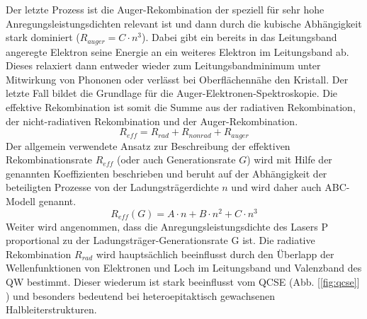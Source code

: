 Der letzte Prozess ist die Auger-Rekombination der speziell für sehr hohe Anregungsleistungsdichten relevant ist und dann durch die kubische Abhängigkeit stark dominiert ($R_{auger} = C \cdot n^3 $). Dabei gibt ein bereits in das Leitungsband angeregte Elektron seine Energie an ein weiteres Elektron im Leitungsband ab. Dieses relaxiert dann entweder wieder zum Leitungsbandminimum unter Mitwirkung von Phononen oder verlässt bei Oberflächennähe den Kristall. Der letzte Fall bildet die Grundlage für die Auger-Elektronen-Spektroskopie.
Die effektive Rekombination ist somit die Summe aus der radiativen Rekombination, der nicht-radiativen Rekombination und der Auger-Rekombination.
\begin{equation}
    R_{eff} = R_{rad} + R_{nonrad} + R_{auger}
    \label{eq:iqe1}
\end{equation}
Der allgemein verwendete Ansatz zur Beschreibung der effektiven Rekombinationsrate $R_{eff}$ (oder auch Generationsrate $G$) wird mit Hilfe der genannten Koeffizienten beschrieben und beruht auf der Abhängigkeit der beteiligten Prozesse von der Ladungsträgerdichte $n$ und wird daher auch ABC-Modell genannt.
\begin{equation}
    R_{eff} (G) = A \cdot n + B \cdot n^2 + C \cdot n^3 
    \label{eq:iqe2}
\end{equation}
Weiter wird angenommen, dass die Anregungsleistungsdichte des Lasers P proportional zu
der Ladungsträger-Generationsrate G ist. Die radiative Rekombination $R_{rad}$ wird hauptsächlich beeinflusst durch den Überlapp der Wellenfunktionen von Elektronen und Loch im Leitungsband und Valenzband des QW bestimmt. Dieser wiederum ist stark beeinflusst vom QCSE (Abb. 
[\ref{fig:qcse}] ) und besonders bedeutend bei heteroepitaktisch gewachsenen Halbleiterstrukturen. 
%
